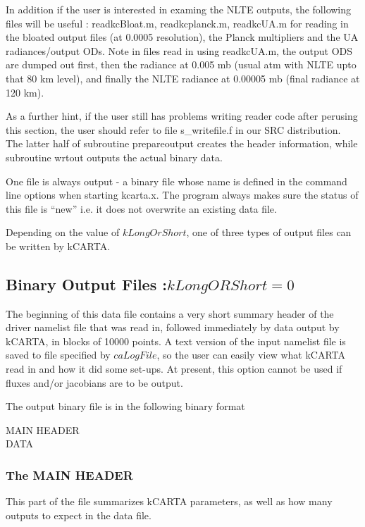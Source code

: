 \documentclass[12pt]{article}
\newcommand{\kc}{\textsf{kCARTA}\xspace}
\newcommand{\ttab}{\indent\indent}
\begin{document}
{{{In addition if the user is interested in examing the NLTE outputs, the
following files will be useful : {\sf readkcBloat.m, readkcplanck.m,
readkcUA.m} for reading in the bloated output files (at 0.0005 \wn resolution), 
the Planck multipliers and the UA radiances/output ODs. Note in files read in
using readkcUA.m, the output ODS are dumped out first, then the radiance at 0.005
mb (usual atm with NLTE upto that 80 km level), and finally the NLTE radiance at
0.00005 mb (final radiance at 120 km).

As a further hint, if the user still has problems writing reader code after 
perusing this section, the user should refer to
file {\sf s\_writefile.f} in our {\sf SRC} distribution. The latter half of 
subroutine {\sf prepareoutput} creates the header information, while 
subroutine {\sf wrtout} outputs the actual binary data.

One file is always output - a binary file whose name is defined in
the command line options when starting kcarta.x. The program always
makes  sure the status of this file is ``new'' i.e. it does not
overwrite an existing data file. 

Depending on the value of $kLongOrShort$, one of three types of 
output files can be written by \kc. 

\subsection{Binary Output Files :$kLongORShort = 0$}

The beginning of this data file contains a very short summary header of the 
driver namelist file that was read in, followed immediately by data output by
\kc, in blocks of 10000 points.  A text version of the input namelist file 
is saved to file specified by $caLogFile$, so the user can easily view what 
\kc read in and how it did some set-ups. At present, this option cannot be 
used if fluxes and/or jacobians are to be output. 

The output binary file is in the following binary format

\smallskip
\ttab MAIN HEADER\\
\ttab DATA

\subsubsection{The MAIN HEADER}

This part of the file summarizes \kc parameters, as well as how many outputs
to expect in the data file. 

}}}
\end{document}
